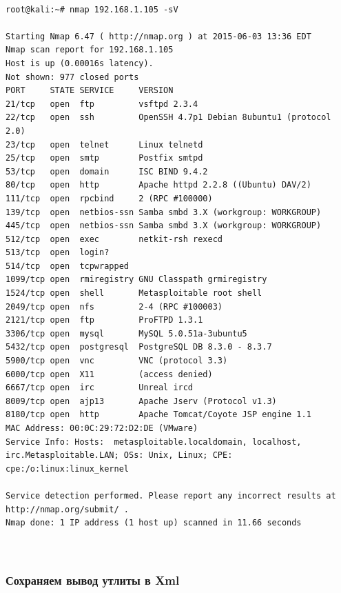 \documentclass[10pt,a4paper]{article}
\begin{document}
\begin{lstlisting}

root@kali:~# nmap 192.168.1.105 -sV

Starting Nmap 6.47 ( http://nmap.org ) at 2015-06-03 13:36 EDT
Nmap scan report for 192.168.1.105
Host is up (0.00016s latency).
Not shown: 977 closed ports
PORT     STATE SERVICE     VERSION
21/tcp   open  ftp         vsftpd 2.3.4
22/tcp   open  ssh         OpenSSH 4.7p1 Debian 8ubuntu1 (protocol 2.0)
23/tcp   open  telnet      Linux telnetd
25/tcp   open  smtp        Postfix smtpd
53/tcp   open  domain      ISC BIND 9.4.2
80/tcp   open  http        Apache httpd 2.2.8 ((Ubuntu) DAV/2)
111/tcp  open  rpcbind     2 (RPC #100000)
139/tcp  open  netbios-ssn Samba smbd 3.X (workgroup: WORKGROUP)
445/tcp  open  netbios-ssn Samba smbd 3.X (workgroup: WORKGROUP)
512/tcp  open  exec        netkit-rsh rexecd
513/tcp  open  login?
514/tcp  open  tcpwrapped
1099/tcp open  rmiregistry GNU Classpath grmiregistry
1524/tcp open  shell       Metasploitable root shell
2049/tcp open  nfs         2-4 (RPC #100003)
2121/tcp open  ftp         ProFTPD 1.3.1
3306/tcp open  mysql       MySQL 5.0.51a-3ubuntu5
5432/tcp open  postgresql  PostgreSQL DB 8.3.0 - 8.3.7
5900/tcp open  vnc         VNC (protocol 3.3)
6000/tcp open  X11         (access denied)
6667/tcp open  irc         Unreal ircd
8009/tcp open  ajp13       Apache Jserv (Protocol v1.3)
8180/tcp open  http        Apache Tomcat/Coyote JSP engine 1.1
MAC Address: 00:0C:29:72:D2:DE (VMware)
Service Info: Hosts:  metasploitable.localdomain, localhost, irc.Metasploitable.LAN; OSs: Unix, Linux; CPE: cpe:/o:linux:linux_kernel

Service detection performed. Please report any incorrect results at http://nmap.org/submit/ .
Nmap done: 1 IP address (1 host up) scanned in 11.66 seconds



\end{lstlisting}


\subsubsection{Сохраняем вывод утлиты в Xml}
\end{document}
